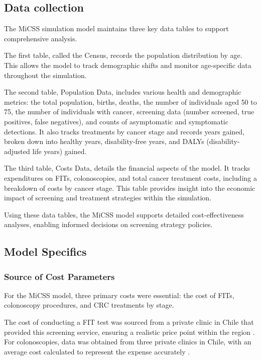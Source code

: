 \documentclass[sn-mathphys-num]{sn-jnl}%
\theoremstyle{thmstyleone}%
\theoremstyle{thmstyletwo}%
\theoremstyle{thmstylethree}%
\begin{document}
\subsection{Data collection}
\label{data_collection}

The MiCSS simulation model maintains three key data tables to support comprehensive analysis.

The first table, called the Census, records the population distribution by age. This allows the model to track demographic shifts and monitor age-specific data throughout the simulation.

The second table, Population Data, includes various health and demographic metrics: the total population, births, deaths, the number of individuals aged 50 to 75, the number of individuals with cancer, screening data (number screened, true positives, false negatives), and counts of asymptomatic and symptomatic detections. It also tracks treatments by cancer stage and records years gained, broken down into healthy years, disability-free years, and DALYs (disability-adjusted life years) gained.

The third table, Costs Data, details the financial aspects of the model. It tracks expenditures on FITs, colonoscopies, and total cancer treatment costs, including a breakdown of costs by cancer stage. This table provides insight into the economic impact of screening and treatment strategies within the simulation.

Using these data tables, the MiCSS model supports detailed cost-effectiveness analyses, enabling informed decisions on screening strategy policies.

\subsection{Model Specifics}

\subsubsection{Source of Cost Parameters}
For the MiCSS model, three primary costs were essential: the cost of FITs, colonoscopy procedures, and CRC treatments by stage.

The cost of conducting a FIT test was sourced from a private clinic in Chile that provided this screening service, ensuring a realistic price point within the region \cite{noauthor_aranceles_nodate-1}. For colonoscopies, data was obtained from three private clinics in Chile, with an average cost calculated to represent the expense accurately \cite{noauthor_aranceles_nodate,noauthor_aranceles_nodate-1,noauthor_aranceles_nodate-2}.
\end{document}
